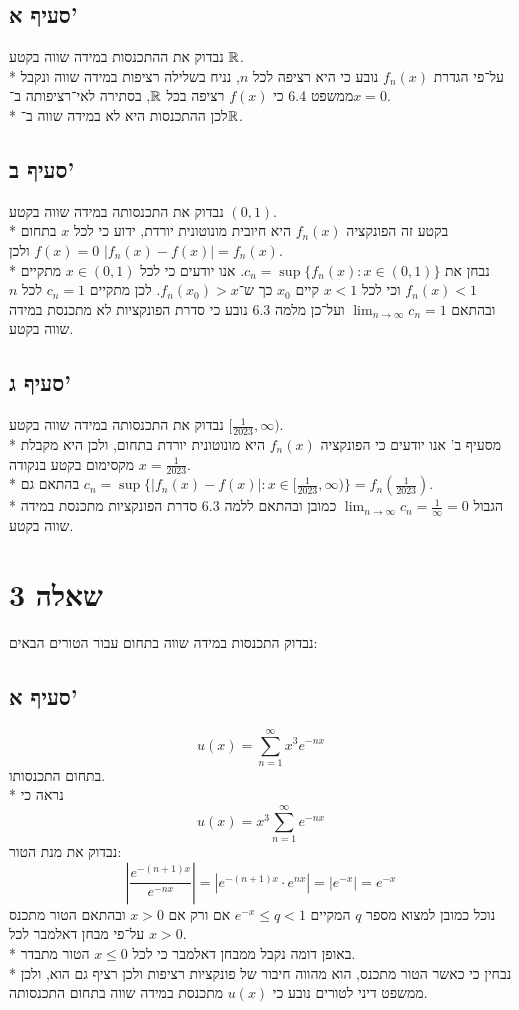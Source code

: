 \subsection{סעיף א'}
נבדוק את ההתכנסות במידה שווה בקטע $\mathbb{R}$. \\*
על־פי הגדרת $f_n(x)$ נובע כי היא רציפה לכל $n$, נניח בשלילה רציפות במידה שווה ונקבל ממשפט 6.4 כי $f(x)$ רציפה בכל $\mathbb{R}$, בסתירה לאי־רציפותה ב־$x = 0$. \\*
לכן ההתכנסות היא לא במידה שווה ב־$\mathbb{R}$.

\subsection{סעיף ב'}
נבדוק את התכנסותה במידה שווה בקטע $(0, 1)$. \\*
בקטע זה הפונקציה $f_n(x)$ היא חיובית מונוטונית יורדת, ידוע כי לכל $x$ בתחום $f(x) = 0$ ולכן $\lvert f_n(x) - f(x) \rvert = f_n(x)$. \\*
נבחן את $c_n = \sup\{ f_n(x) : x \in (0, 1)\}$. אנו יודעים כי לכל $x \in (0, 1)$ מתקיים $f_n(x) < 1$ וכי לכל $x < 1$ קיים $x_0$ כך ש־$f_n(x_0) > x$.
לכן מתקיים $c_n = 1$ לכל $n$ ובהתאם $\lim_{n \to \infty} c_n = 1$ ועל־כן מלמה 6.3 נובע כי סדרת הפונקציות לא מתכנסת במידה שווה בקטע.

\subsection{סעיף ג'}
נבדוק את התכנסותה במידה שווה בקטע $[\frac{1}{2023}, \infty)$. \\* %
מסעיף ב' אנו יודעים כי הפונקציה $f_n(x)$ היא מונוטונית יורדת בתחום, ולכן היא מקבלת מקסימום בקטע בנקודה $x = \frac{1}{2023}$. \\*
בהתאם גם $c_n = \sup\{ \lvert f_n(x) - f(x) \rvert : x \in [\frac{1}{2023}, \infty)\} = f_n(\frac{1}{2023})$. \\* %
הגבול $\lim_{n \to \infty} c_n = \frac{1}{\infty} = 0$ כמובן ובהתאם ללמה 6.3 סדרת הפונקציות מתכנסת במידה שווה בקטע.

\section{שאלה 3}
נבדוק התכנסות במידה שווה בתחום עבור הטורים הבאים:

\subsection{סעיף א'}
\[
	u(x) = \sum_{n = 1}^{\infty} x^3e^{-nx}
\]
בתחום התכנסותו. \\*
נראה כי
\[
	u(x) = x^3 \sum_{n = 1}^{\infty} e^{-nx}
\]
נבדוק את מנת הטור:
\[
	\left\lvert \frac{e^{-(n + 1)x}}{e^{-nx}} \right\rvert
	= \left\lvert e^{-(n + 1)x} \cdot e^{nx} \right\rvert
	= \left\lvert e^{-x} \right\rvert
	=  e^{-x} 
\]
נוכל כמובן למצוא מספר $q$ המקיים $e^{-x} \le q < 1$ אם ורק אם $x > 0$ ובהתאם הטור מתכנס על־פי מבחן דאלמבר לכל $x > 0$. \\*
באופן דומה נקבל ממבחן דאלמבר כי לכל $x \le 0$ הטור מתבדר. \\*
נבחין כי כאשר הטור מתכנס, הוא מהווה חיבור של פונקציות רציפות ולכן רציף גם הוא,
ולכן ממשפט דיני לטורים נובע כי $u(x)$ מתכנסת במידה שווה בתחום התכנסותה.

